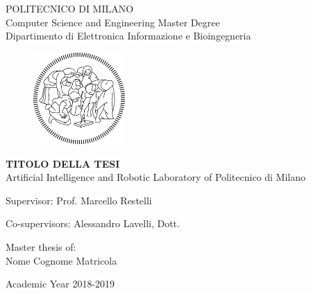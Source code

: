 \thispagestyle{empty}
\vspace*{-1.5cm}
 \bfseries{
\begin{center}
  \large
  POLITECNICO DI MILANO\\
  \normalsize
  Computer Science and Engineering Master Degree\\
  Dipartimento di Elettronica Informazione e Bioingegneria\\
  \begin{figure}[htbp]
    \begin{center}
      \includegraphics[width=3.5cm]{./img/logo/logo poli}
    \end{center}
  \end{figure}
  \vspace*{0.1cm} \LARGE


  \textbf{TITOLO DELLA TESI}\\


  \vspace*{.75truecm} \large
  Artificial Intelligence and Robotic Laboratory \newline of Politecnico di Milano
\end{center}
\vspace*{2.0cm} \large
\begin{flushleft}


  Supervisor: Prof. Marcello Restelli \\

  \begin{tabbing}  
      Co-supervisors: Alessandro Lavelli, Dott.

  \end{tabbing}
\end{flushleft}
\vspace*{1.0cm}
\begin{flushright}


  Master thesis of:\\ Nome Cognome Matricola\\


\end{flushright}
\vspace*{0.8cm}
\begin{center}

  Academic Year 2018-2019
\end{center} \clearpage
}
